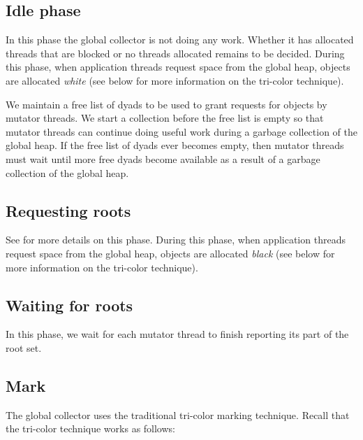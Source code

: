 \subsection{Idle phase}

In this phase the global collector is not doing any work.  Whether it
has allocated threads that are blocked or no threads allocated
remains to be decided.  During this phase, when application threads
request space from the global heap, objects are allocated \emph{white}
(see below for more information on the tri-color technique).

We maintain a free list of dyads to be used to grant requests for
objects by mutator threads.  We start a collection before the free
list is empty so that mutator threads can continue doing useful work
during a garbage collection of the global heap.  If the free list of
dyads ever becomes empty, then mutator threads must wait until more
free dyads become available as a result of a garbage collection of the
global heap.

\subsection{Requesting roots}


See 
for more details on this phase.  During this phase, when application
threads request space from the global heap, objects are allocated
\emph{black} (see below for more information on the tri-color
technique).

\subsection{Waiting for roots}

In this phase, we wait for each mutator thread to finish reporting its
part of the root set.

\subsection{Mark}

The global collector uses the traditional tri-color marking
technique.  Recall that the tri-color technique works as follows:

